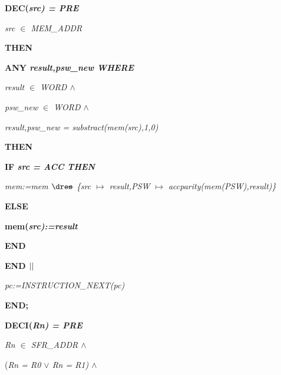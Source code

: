 \begin{sloppypar}
\hspace*{0.10in}\bf DEC\rm (\it src\rm ) \rm = \bf PRE

\hspace*{0.20in}\it src $\in$  \it MEM\_ADDR

\hspace*{0.10in}\bf THEN

\hspace*{0.20in}\bf ANY \it result\rm ,\it psw\_new \bf WHERE

\hspace*{0.30in}\it result $\in$  \it WORD  $\land$ 

\hspace*{0.30in}\it psw\_new $\in$  \it WORD  $\land$ 

\hspace*{0.30in}\it result\rm ,\it psw\_new \rm = \it substract\rm (\it mem\rm (\it src\rm )\rm ,\rm 1\rm ,\rm 0\rm )

\hspace*{0.20in}\bf THEN

\hspace*{0.30in}\bf IF \it src \rm = \it ACC \bf THEN

\hspace*{0.40in}\it mem\rm :=\it mem $\lover$ \rm \{\it src $\mapsto$ \it result\rm ,\it PSW $\mapsto$ \it accparity\rm (\it mem\rm (\it PSW\rm )\rm ,\it result\rm )\rm \}

\hspace*{0.30in}\bf ELSE

\hspace*{0.40in}\bf mem\rm (\it src\rm )\rm :=\it result

\hspace*{0.30in}\bf END

\hspace*{0.20in}\bf END  $\mbox{$\mid\mid$}$ 

\hspace*{0.20in}\it pc\rm :=\it INSTRUCTION\_NEXT\rm (\it pc\rm )

\hspace*{0.10in}\bf END\rm ;

\hspace*{0.10in}\bf DECI\rm (\it Rn\rm ) \rm = \bf PRE

\hspace*{0.20in}\it Rn $\in$  \it SFR\_ADDR  $\land$ 

\hspace*{0.20in}\rm (\it Rn \rm = \it R0  $\lor$  \it Rn \rm = \it R1\rm )  $\land$ 


\end{sloppypar}
